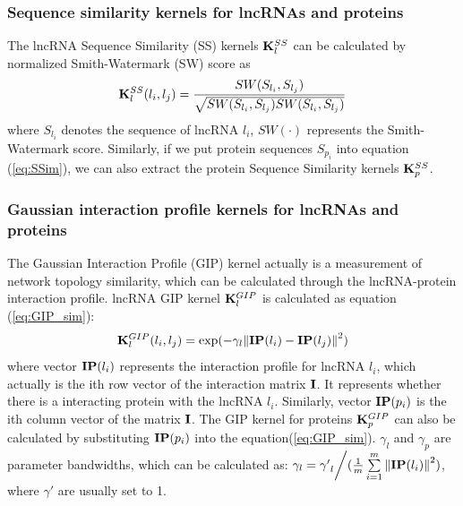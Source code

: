 \documentclass[fleqn,10pt]{wlscirep}
\begin{document}
\subsubsection*{Sequence similarity kernels for lncRNAs and proteins}
The lncRNA Sequence Similarity (SS) kernels ${\bf{K}}_l^{SS}$ can be calculated by normalized Smith-Watermark (SW) score as\cite{Shen2019}
\begin{equation}
{\bf{K}}_l^{SS}({l_i},{l_j}) = \frac{{SW({S_{{l_i}}},{S_{{l_j}}})}}{{\sqrt {SW({S_{{l_i}}},{S_{{l_j}}})SW({S_{{l_i}}},{S_{{l_j}}})} }} \label{eq:SSim}
\end{equation}
where ${{S_{{l_i}}}}$ denotes the sequence of lncRNA ${l_i}$, $SW( \cdot )$ represents the Smith-Watermark score. Similarly, if we put protein sequences ${{S_{{p_i}}}}$ into equation (\ref{eq:SSim}), we can also extract the protein Sequence Similarity kernels ${\bf{K}}_p^{SS}$.

\subsubsection*{Gaussian interaction profile kernels for lncRNAs and proteins}
The Gaussian Interaction Profile (GIP) kernel actually is a measurement of network topology similarity\cite{VanLaarhoven2011}, which can be calculated through the lncRNA-protein interaction profile. lncRNA GIP kernel ${\bf{K}}_l^{GIP}$ is calculated as equation (\ref{eq:GIP_sim}):
\begin{equation} \label{eq:GIP_sim}
{\bf{K}}_l^{GIP}({l_i},{l_j}) = \exp ( - {\gamma _l}{\left\| {{\bf{IP}}({l_i}) - {\bf{IP}}({l_j})} \right\|^2})
\end{equation}
where vector ${{\bf{IP}}({l_i})}$ represents the interaction profile for lncRNA $l_i$, which actually is the ith row vector of the interaction matrix ${\bf{I}}$. It represents whether there is a interacting protein with the lncRNA $l_i$. Similarly, vector ${{\bf{IP}}({p_i})}$ is the ith column vector of the matrix ${\bf{I}}$. The GIP kernel for proteins ${\bf{K}}_p^{GIP}$ can also be calculated by substituting ${{\bf{IP}}({p_i})}$ into the equation(\ref{eq:GIP_sim}).
   ${\gamma _l}$ and ${\gamma _p}$ are parameter bandwidths, which can be calculated as: ${\gamma _l} = {{{{\gamma '}_l}} \mathord{\left/
 {\vphantom {{{{\gamma '}_l}} {(\frac{1}{m}\sum\limits_{i = 1}^m {{{\left\| {{\bf{IP}}({l_i})} \right\|}^2}} )}}} \right.
 \kern-\nulldelimiterspace} {(\frac{1}{m}\sum\limits_{i = 1}^m {{{\left\| {{\bf{IP}}({l_i})} \right\|}^2}} )}}$, where ${\gamma '}$ are usually set to 1.
\end{document}

